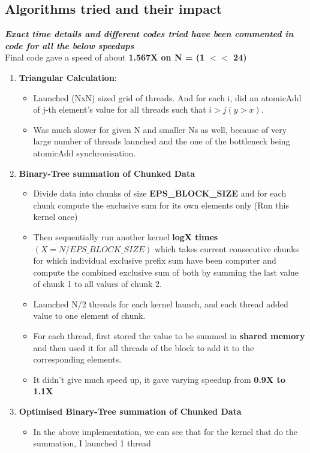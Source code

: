 \documentclass[a4paper]{article}
\begin{document}
\subsection{Algorithms tried and their impact}
{\bf \emph{Exact time details and different codes tried have been commented in code for all the below speedups}}\\
\newline
Final code gave a speed of about {\bf 1.567X on N = (1 $<<$ 24)} \\
\begin{enumerate}
\item {\bf Triangular Calculation}:
	\begin{itemize}
	\item Launched (NxN) sized grid of threads. And for each i, did an atomicAdd of j-th element's value for all
	threads such that $i > j (y > x)$.
	\item Was much slower for given N and smaller Ns as well, because of very large number of 
	threads launched and the one of the bottleneck being atomicAdd synchronisation.
	\end{itemize}
\item {\bf Binary-Tree summation of Chunked Data}
	\begin{itemize}
	\item Divide data into chunks of size {\bf EPS\_BLOCK\_SIZE} and for each chunk compute the exclusive
	sum for its own elements only (Run this kernel once)
	\item Then sequentially run another kernel {\bf logX times $(X = N / EPS\_BLOCK\_SIZE)$} which takes
	current consecutive chunks for which individual exclusive prefix sum have been computer and compute
	the combined exclusive sum of both by summing the last value of chunk 1 to all values of chunk 2.
	\item Launched N/2 threads for each kernel launch, and each thread added value to one element of chunk.
	\item For each thread, first stored the value to be summed in {\bf shared memory} and then used it for all
	threads of the block to add it to the corresponding elements.
	\item It didn't give much speed up, it gave varying speedup from {\bf 0.9X to 1.1X}
	\end{itemize}
\item {\bf Optimised Binary-Tree summation of Chunked Data}
	\begin{itemize}
	\item In the above implementation, we can see that for the kernel that do the summation, I launched 1 thread

\end{itemize}
\end{enumerate}
\end{document}
